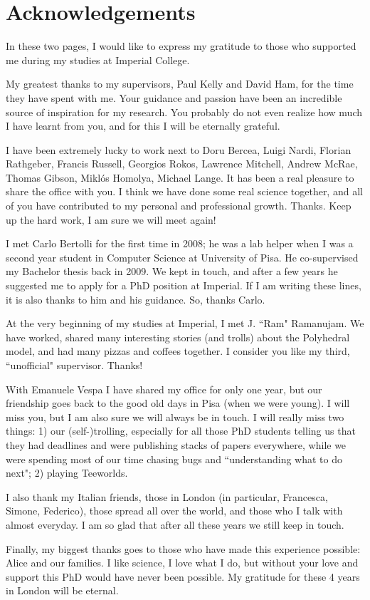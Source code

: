 \chapter*{Acknowledgements}\thispagestyle{plain}
In these two pages, I would like to express my gratitude to those who supported me during my studies at Imperial College. 

My greatest thanks to my supervisors, Paul Kelly and David Ham, for the time they have spent with me. Your guidance and passion have been an incredible source of inspiration for my research. You probably do not even realize how much I have learnt from you, and for this I will be eternally grateful.

I have been extremely lucky to work next to Doru Bercea, Luigi Nardi, Florian Rathgeber, Francis Russell, Georgios Rokos, Lawrence Mitchell, Andrew McRae, Thomas Gibson, Miklós Homolya, Michael Lange. It has been a real pleasure to share the office with you. I think we have done some real science together, and all of you have contributed to my personal and professional growth. Thanks. Keep up the hard work, I am sure we will meet again!

I met Carlo Bertolli for the first time in 2008; he was a lab helper when I was a second year student in Computer Science at University of Pisa. He co-supervised my Bachelor thesis back in 2009. We kept in touch, and after a few years he suggested me to apply for a PhD position at Imperial. If I am writing these lines, it is also thanks to him and his guidance. So, thanks Carlo. 

At the very beginning of my studies at Imperial, I met J. ``Ram" Ramanujam. We have worked, shared many interesting stories (and trolls) about the Polyhedral model, and had many pizzas and coffees together. I consider you like my third, ``unofficial" supervisor. Thanks!

With Emanuele Vespa I have shared my office for only one year, but our friendship goes back to the good old days in Pisa (when we were young). I will miss you, but I am also sure we will always be in touch. I will really miss two things: 1) our (self-)trolling, especially for all those PhD students telling us that they had deadlines and were publishing stacks of papers everywhere, while we were spending most of our time chasing bugs and ``understanding what to do next"; 2) playing Teeworlds. 

I also thank my Italian friends, those in London (in particular, Francesca, Simone, Federico), those spread all over the world, and those who I talk with almost everyday. I am so glad that after all these years we still keep in touch. 

Finally, my biggest thanks goes to those who have made this experience possible: Alice and our families. I like science, I love what I do, but without your love and support this PhD would have never been possible. My gratitude for these 4 years in London will be eternal.

